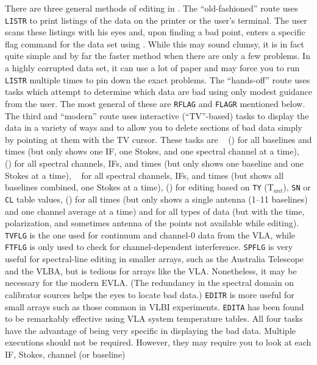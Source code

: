      There are three general methods of editing in \hbox{\AIPS}.  The
``old-fashioned'' route uses {\tt LISTR} to print listings of the data
on the printer or the user's terminal.  The user scans these listings
with his eyes and, upon finding a bad point, enters a specific flag
command for the data set using {\tt {}}\@.  While this
may sound clumsy, it is in fact quite simple and by far the faster
method when there are only a few problems.  In a highly corrupted data
set, it can use a lot of paper and may force you to run {\tt LISTR}
multiple times to pin down the exact problems.  The ``hands-off''
route uses tasks which attempt to determine which data are bad using
only modest guidance from the user.  The most general of these are
{\tt RFLAG} and {\tt FLAGR} mentioned below.  The third and ``modern''
route uses interactive (``TV''-based) tasks to display the data in a
variety of ways and to allow you to delete sections of bad data simply
by pointing at them with the TV cursor.  These tasks are {\tt
{}} () for all baselines and times (but only shows
one IF, one Stokes, and one spectral channel at a time), {\tt
{}} () for all spectral channels, IFs, and times
(but only shows one baseline and one Stokes at a time),  {\tt
{}} for all spectral channels, IFs, and times (but shows all
baselines combined, one Stokes at a time), {\tt {}}
() for editing based on {\tt TY} (T$_{ant}$), {\tt SN} or
{\tt CL} table values,  {\tt {}} () for all
times (but only shows a single antenna (1--11 baselines) and one channel
average at a time) and {\tt {}} for all types of data (but
with the time, polarization, and sometimes antenna of the points not
available while editing).  {\tt TVFLG} is the one used for continuum
and channel-0 data from the VLA, while {\tt FTFLG} is only used to
check for channel-dependent interference.  {\tt SPFLG} is very useful
for spectral-line editing in smaller arrays, such as the Australia
Telescope and the VLBA, but is tedious for arrays like the VLA.
Nonetheless, it may be necessary for the modern EVLA\@.  (The
redundancy in the spectral domain on calibrator sources helps the eyes
to locate bad data.)  {\tt EDITR} is more useful for small arrays such
as those common in VLBI experiments.  {\tt EDITA} has been found to be
remarkably effective using VLA system temperature tables.  All four
tasks have the advantage of being very specific in displaying the bad
data.  Multiple executions should not be required. However, they may
require you to look at each IF, Stokes, channel (or baseline)
